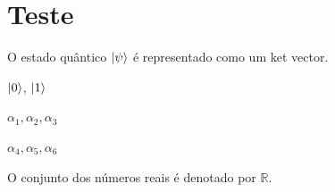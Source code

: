 \documentclass[12pt]{article}
\begin{document}
\newpage
\section{Teste}

O estado quântico $\ket{\psi}$ é representado como um ket vector.

$\ket{0}$, $\ket{1}$

$\alpha_{1}, \alpha_{2}, \alpha_{3}$

\(\alpha_{4}, \alpha_{5}, \alpha_{6} \)

O conjunto dos números reais é denotado por $\mathbb{R}$.



\newpage

	
\end{document}
